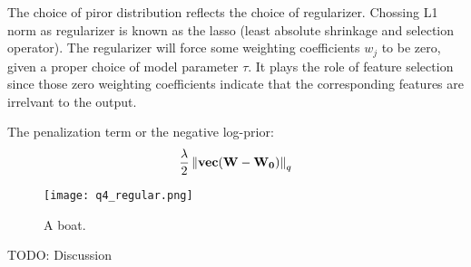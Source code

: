 \documentclass[12pt]{article}
\newenvironment{question}[2][Question]{\begin{trivlist}
\kern10pt
\item[\hskip \labelsep {\bfseries #1}\hskip \labelsep {\bfseries #2.}]}{\end{trivlist}}
\begin{document}
\begin{question}{4}
The choice of piror distribution reflects the choice of regularizer. Chossing L1 
norm as regularizer is known as the lasso (least absolute shrinkage and selection operator).
The regularizer will force some weighting coefficients $w_j$ to be zero, given 
a proper choice of model parameter $\tau$. It plays the role of feature selection
since those zero weighting coefficients indicate that the corresponding features
are irrelvant to the output. \par

The penalization term or the negative log-prior:
$$  \frac{\lambda}{2} \left \|\textbf{vec}(\bf{W} - \bf{W}_0)\right \|_{q}  $$

\begin{figure}[h!]
  \centering
  \texttt{[image: q4\_regular.png]}
  \caption{A boat.}
  \label{fig:boat1}
\end{figure}

TODO: Discussion
\end{question}
\end{document}
